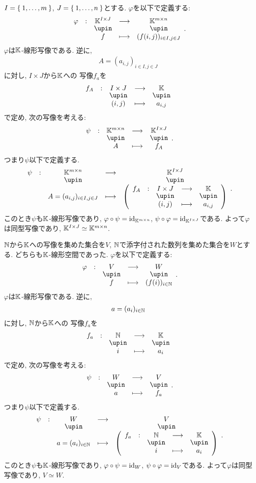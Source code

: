 \begin{example}
  $I=\Set{1,\dots,m}$, $J=\Set{1,\ldots,n}$とする.
  $\varphi$を以下で定義する:
  \begin{align*}
    \shazo{\varphi}{\KK^{I\times J}}{\KK^{m\times n}}{f}{(f(i,j))_{i\in I,j\in J}}.
  \end{align*}
  $\varphi$は$\mathbb{K}$-線形写像である.
  逆に,
  \begin{align*}
    A=
      (a_{i,j})_{i\in I,j\in J}
  \end{align*}
  に対し,
  $I\times J$から$\mathbb{K}$への
  写像$f_a$を
  \begin{align*}
    \shazo{f_A}{I\times J}{\KK}{(i,j)}{a_{i,j}}
  \end{align*}
  で定め,
  次の写像を考える:
  \begin{align*}
    \shazo{\psi}{\KK^{m\times n}}{\KK^{I\times J}}{A}{f_A}.
  \end{align*}
  つまり$\psi$以下で定義する.
  \begin{align*}
    \shazo{\psi}{\KK^{m\times n}}{\KK^{I\times J}}
          {A=(a_{i,j})_{i\in I,j\in J}}{\left(\shazo{f_A}{I\times J}{\KK}{(i,j)}{a_{i,j}}\right)}.
  \end{align*}
  このとき$\psi$も$\mathbb{K}$-線形写像であり,
  $\varphi\circ\psi=\operatorname{id}_{\mathbb{K}^{m\times n}}$,
  $\psi\circ\varphi=\operatorname{id}_{\mathbb{K}^{I\times J}}$である.
  よって$\varphi$は同型写像であり,
  $\mathbb{K}^{I\times J}\simeq \mathbb{K}^{m\times n}$.
\end{example}

\begin{example}
  $\mathbb{N}$から$\mathbb{K}$への写像を集めた集合を$V$,
  $\mathbb{N}$で添字付された数列を集めた集合を$W$とする.
  どちらも$\mathbb{K}$-線形空間であった.
  $\varphi$を以下で定義する:
  \begin{align*}
    \shazo{\varphi}{V}{W}{f}{(f(i))_{i\in \NN}}.
  \end{align*}
  $\varphi$は$\mathbb{K}$-線形写像である.
  逆に,
  \begin{align*}
    a=
      (a_{i})_{i\in \mathbb{N}}
  \end{align*}
  に対し,
  $\mathbb{N}$から$\mathbb{K}$への
  写像$f_a$を
  \begin{align*}
    \shazo{f_a}{\NN}{\KK}{i}{a_{i}}
  \end{align*}
  で定め,
  次の写像を考える:
  \begin{align*}
    \shazo{\psi}{W}{V}{a}{f_a}.
  \end{align*}
  つまり$\psi$以下で定義する.
  \begin{align*}
    \shazo{\psi}{W}{V}{a=(a_{i})_{i\in \NN}}{\left(\shazo{f_a}{\NN}{\KK}{i}{a_{i}}\right)}.
  \end{align*}
  このとき$\psi$も$\mathbb{K}$-線形写像であり,
  $\varphi\circ\psi=\operatorname{id}_{W}$,
  $\psi\circ\varphi=\operatorname{id}_{V}$である.
  よって$\varphi$は同型写像であり,
  $V\simeq W$.
\end{example}

